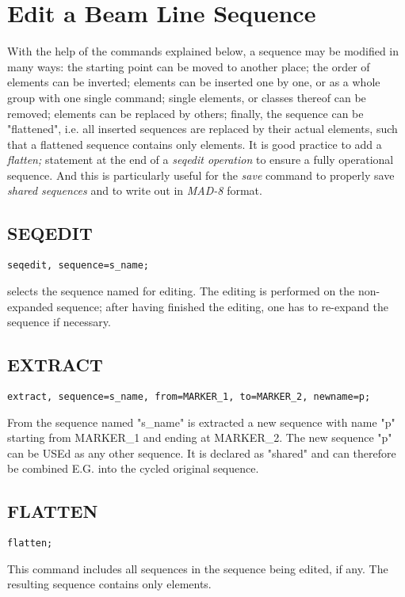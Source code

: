 
\chapter{Edit a Beam Line Sequence}


With the help of the commands explained below, a sequence may be
modified in many ways: the starting point can be moved to another place;
the order of elements can be inverted; elements can be inserted one by
one, or as a whole group with one single command; single elements, or
classes thereof can be removed; elements can be replaced by others;
finally, the sequence can be "flattened", i.e. all inserted sequences
are replaced by their actual elements, such that a flattened sequence
contains only elements. It is good practice to add a \textit{ flatten; }
statement at the end of a \textit{ seqedit operation } to ensure a fully
operational sequence. And this is particularly useful for the \textit{
  save } command to properly save \textit{ shared sequences } and to
write out in \textit{ MAD-8 } format.  


\section{SEQEDIT}
\begin{verbatim}
seqedit, sequence=s_name;
\end{verbatim} 
selects the sequence named for editing. The editing is performed on the
non-expanded sequence; after having finished the editing, one has to
re-expand the sequence if necessary.  




\section{EXTRACT}
\begin{verbatim}
extract, sequence=s_name, from=MARKER_1, to=MARKER_2, newname=p;
\end{verbatim} 
From the sequence named "s\_name" is extracted a new sequence with name
"p" starting from MARKER\_1 and ending at MARKER\_2. The new sequence
"p" can be USEd as any other sequence. It is declared as "shared" and
can therefore be combined E.G. into the cycled original sequence.  


\section{FLATTEN}
\begin{verbatim}
flatten;
\end{verbatim} 
This command includes all sequences in the sequence being edited, if
any. The resulting sequence contains only elements.  


